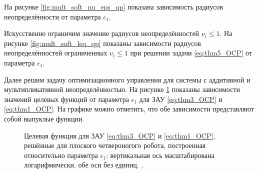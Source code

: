 На рисунке \ref{fig:mult_soft_nu_eps_qp} показана зависимость радиусов неопределённости от параметра $\epsilon_1$.

Искусственно ограничим значение радиусов неопределённостей $\nu_i \leq 1$. На рисунке \ref{fig:mult_soft_leq_qp} показаны зависимости радиусов неопределённостей ограниченных $\nu_i \leq 1$ при решении задачи \eqref{eq:thm5_OCP} от параметра $\epsilon_1$.

Далее решим задачу оптимизационного управления для системы с аддитивной и мультипликативной неопределённостью. На рисунке \ref{fig:additive} показаны зависимости значений целевых функций от параметра $\epsilon_1$ для ЗАУ \eqref{eq:thm3_OCP} и \eqref{eq:thm1_OCP}. На графике можно отметить, что обе зависимости представляют собой выпуклые функции.
\begin{figure}[ht]
	\caption{Целевая функция для ЗАУ \eqref{eq:thm3_OCP} и \eqref{eq:thm1_OCP}, решённые для плоского четвероногого робота, построенная относительно параметра $\epsilon_1$; вертикальная ось масштабирована логарифмически, обе оси без единиц. .} \label{fig:additive}
\end{figure}

